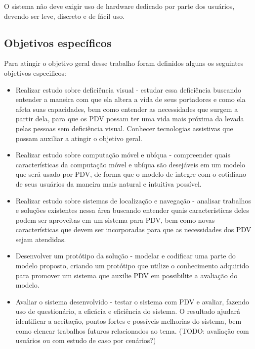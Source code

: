 \documentclass[english,brazilian]{UNISINOSmonografia}
\begin{document}
		O sistema não deve exigir uso de hardware dedicado por parte dos usuários, devendo ser leve, discreto e de fácil uso.
		
		\subsection{Objetivos específicos}
		Para atingir o objetivo geral desse trabalho foram definidos alguns os seguintes objetivos especificos:

		\begin{itemize}
			\item Realizar estudo sobre deficiência visual - estudar essa deficiência buscando entender a maneira com que ela altera a vida de seus portadores e como ela afeta suas capacidades, bem como entender as necessidades que surgem a partir dela, para que os PDV possam ter uma vida mais próxima da levada pelas pessoas sem deficiência visual. Conhecer tecnologias assistivas que possam auxiliar a atingir o objetivo geral.

			\item Realizar estudo sobre computação móvel e ubíqua - compreender quais características da computação móvel e ubíqua são desejáveis em um modelo que será usado por PDV, de forma que o modelo de integre com o cotidiano de seus usuários da maneira mais natural e intuitiva possível.

			\item Realizar estudo sobre sistemas de localização e navegação - analisar trabalhos e soluções existentes nessa área buscando entender quais características deles podem ser aproveitas em um sistema para PDV, bem como novas características que devem ser incorporadas para que as necessidades dos PDV sejam atendidas.

			\item Desenvolver um protótipo da solução - modelar e codificar uma parte do modelo proposto, criando um protótipo que utilize o conhecimento adquirido para promover um sistema que auxilie PDV em 
			possibilite a avaliação do modelo.

			\item Avaliar o sistema desenvolvido - testar o sistema com PDV e avaliar, fazendo uso de questionário, a eficácia e eficiência do sistema. O resultado ajudará identificar a aceitação, pontos fortes e possíveis melhorias do sistema, bem como elencar trabalhos futuros relacionados ao tema. (TODO: avaliação com usuários ou com estudo de caso por cenários?) 
		\end{itemize}
\end{document}
